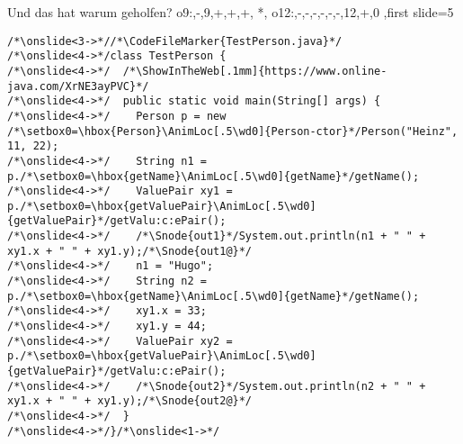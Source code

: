 {\begin{frame}[fragile,t]{Und das hat warum geholfen?}
{{    o9:{},-,9,+,+,+,
    *,
    o12:{},-,-,-,-,-,-,12,+,0
},first slide=5}
\begin{verbatim}
/*\onslide<3->*//*\CodeFileMarker{TestPerson.java}*/
/*\onslide<4->*/class TestPerson {
/*\onslide<4->*/  /*\ShowInTheWeb[.1mm]{https://www.online-java.com/XrNE3ayPVC}*/
/*\onslide<4->*/  public static void main(String[] args) {
/*\onslide<4->*/    Person p = new /*\setbox0=\hbox{Person}\AnimLoc[.5\wd0]{Person-ctor}*/Person("Heinz", 11, 22);
/*\onslide<4->*/    String n1 = p./*\setbox0=\hbox{getName}\AnimLoc[.5\wd0]{getName}*/getName();
/*\onslide<4->*/    ValuePair xy1 = p./*\setbox0=\hbox{getValuePair}\AnimLoc[.5\wd0]{getValuePair}*/getValu:c:ePair();
/*\onslide<4->*/    /*\Snode{out1}*/System.out.println(n1 + " " + xy1.x + " " + xy1.y);/*\Snode{out1@}*/
/*\onslide<4->*/    n1 = "Hugo";
/*\onslide<4->*/    String n2 = p./*\setbox0=\hbox{getName}\AnimLoc[.5\wd0]{getName}*/getName();
/*\onslide<4->*/    xy1.x = 33;
/*\onslide<4->*/    xy1.y = 44;
/*\onslide<4->*/    ValuePair xy2 = p./*\setbox0=\hbox{getValuePair}\AnimLoc[.5\wd0]{getValuePair}*/getValu:c:ePair();
/*\onslide<4->*/    /*\Snode{out2}*/System.out.println(n2 + " " + xy1.x + " " + xy1.y);/*\Snode{out2@}*/
/*\onslide<4->*/  }
/*\onslide<4->*/}/*\onslide<1->*/
\end{verbatim}
\endAnimateCode{}
\endcolumns%
\end{frame}}

